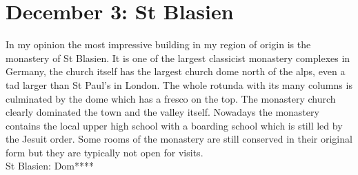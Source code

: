 \section{December 3: St Blasien}
\label{2008:StBlasien}

In my opinion the most impressive building in my region of origin is the monastery of St Blasien. It is one of the largest classicist monastery complexes in Germany, the church itself has the largest church dome north of the alps, even a tad larger than St Paul's in London. The whole rotunda with its many columns is culminated by the dome which has a fresco on the top. The monastery church clearly dominated the town and the valley itself. Nowadays the monastery contains the local upper high school with a boarding school which is still led by the Jesuit order. Some rooms of the monastery are still conserved in their original form but they are typically not open for visits.\\

St Blasien: Dom****
